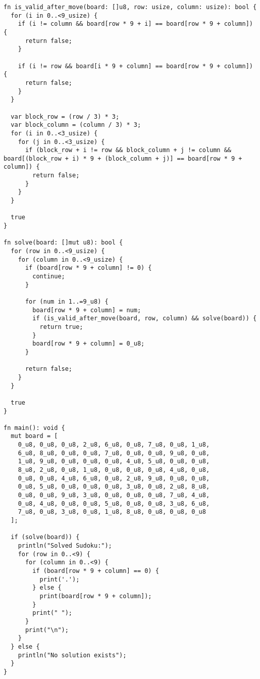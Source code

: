 \begin{mdframed}[style=examplestyle]
	\begin{verbatim}
fn is_valid_after_move(board: []u8, row: usize, column: usize): bool {
  for (i in 0..<9_usize) {
    if (i != column && board[row * 9 + i] == board[row * 9 + column]) {
      return false;
    }

    if (i != row && board[i * 9 + column] == board[row * 9 + column]) {
      return false;
    }
  }

  var block_row = (row / 3) * 3;
  var block_column = (column / 3) * 3;
  for (i in 0..<3_usize) {
    for (j in 0..<3_usize) {
      if (block_row + i != row && block_column + j != column && board[(block_row + i) * 9 + (block_column + j)] == board[row * 9 + column]) {
        return false;
      }
    }
  }

  true
}

fn solve(board: []mut u8): bool {
  for (row in 0..<9_usize) {
    for (column in 0..<9_usize) {
      if (board[row * 9 + column] != 0) {
        continue;
      }

      for (num in 1..=9_u8) {
        board[row * 9 + column] = num;
        if (is_valid_after_move(board, row, column) && solve(board)) {
          return true;
        }
        board[row * 9 + column] = 0_u8;
      }

      return false;
    }
  }

  true
}

fn main(): void {
  mut board = [
    0_u8, 0_u8, 0_u8, 2_u8, 6_u8, 0_u8, 7_u8, 0_u8, 1_u8,
    6_u8, 8_u8, 0_u8, 0_u8, 7_u8, 0_u8, 0_u8, 9_u8, 0_u8,
    1_u8, 9_u8, 0_u8, 0_u8, 0_u8, 4_u8, 5_u8, 0_u8, 0_u8,
    8_u8, 2_u8, 0_u8, 1_u8, 0_u8, 0_u8, 0_u8, 4_u8, 0_u8,
    0_u8, 0_u8, 4_u8, 6_u8, 0_u8, 2_u8, 9_u8, 0_u8, 0_u8,
    0_u8, 5_u8, 0_u8, 0_u8, 0_u8, 3_u8, 0_u8, 2_u8, 8_u8,
    0_u8, 0_u8, 9_u8, 3_u8, 0_u8, 0_u8, 0_u8, 7_u8, 4_u8,
    0_u8, 4_u8, 0_u8, 0_u8, 5_u8, 0_u8, 0_u8, 3_u8, 6_u8,
    7_u8, 0_u8, 3_u8, 0_u8, 1_u8, 8_u8, 0_u8, 0_u8, 0_u8
  ];

  if (solve(board)) {
    println("Solved Sudoku:");
    for (row in 0..<9) {
      for (column in 0..<9) {
        if (board[row * 9 + column] == 0) {
          print('.');
        } else {
          print(board[row * 9 + column]);
        }
        print(" ");
      }
      print("\n");
    }
  } else {
    println("No solution exists");
  }
}
	\end{verbatim}
\end{mdframed}
